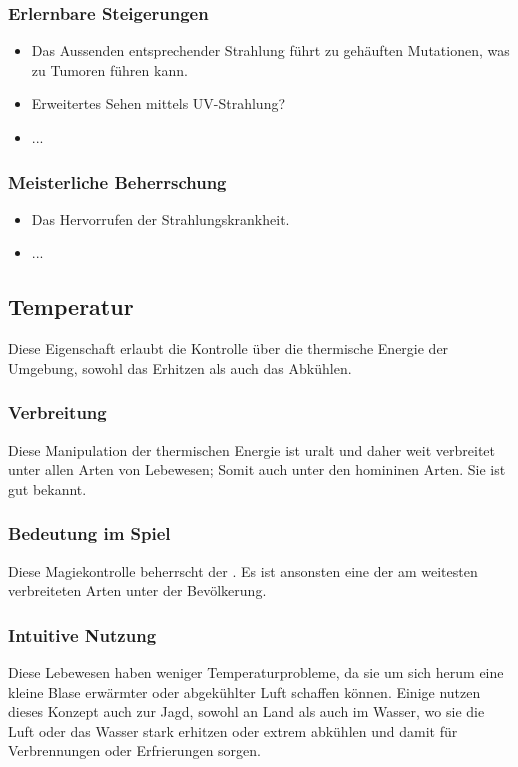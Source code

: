 \subsubsection{Erlernbare Steigerungen}
\begin{itemize}
	\item Das Aussenden entsprechender Strahlung führt zu gehäuften Mutationen, was zu Tumoren führen kann.
	\item Erweitertes Sehen mittels UV-Strahlung?
	\item ...
\end{itemize}

\subsubsection{Meisterliche Beherrschung} 
\begin{itemize}
	\item Das Hervorrufen der Strahlungskrankheit.
	\item ...
\end{itemize}



\subsection{Temperatur}\label{sec:temperaturmagie}
Diese Eigenschaft erlaubt die Kontrolle über die thermische Energie der Umgebung, sowohl das Erhitzen als auch das Abkühlen.

\subsubsection{Verbreitung}
Diese Manipulation der thermischen Energie ist uralt und daher weit verbreitet unter allen Arten von Lebewesen; Somit auch unter den homininen Arten. Sie ist gut bekannt.

\subsubsection{Bedeutung im Spiel}
Diese Magiekontrolle beherrscht der . Es ist ansonsten eine der am weitesten verbreiteten Arten unter der Bevölkerung.

\subsubsection{Intuitive Nutzung}
Diese Lebewesen haben weniger Temperaturprobleme, da sie um sich herum eine kleine Blase erwärmter oder abgekühlter Luft schaffen können. Einige nutzen dieses Konzept auch zur Jagd, sowohl an Land als auch im Wasser, wo sie die Luft oder das Wasser stark erhitzen oder extrem abkühlen und damit für Verbrennungen oder Erfrierungen sorgen.

